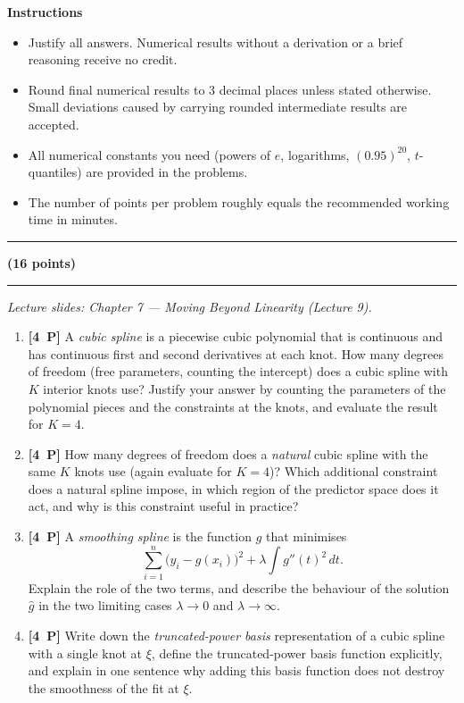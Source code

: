 \documentclass[11pt,a4paper]{article}
\newcommand{\problem}[2]{\par\vspace{7mm}\noindent{\large\textbf{Problem #1}}%
  \hfill{\large\textbf{(#2 points)}}\par\nopagebreak\vspace{0.6mm}%
  \noindent\rule{\textwidth}{0.6pt}\par\nopagebreak\vspace{2.5mm}}
\newcommand{\pp}[1]{\textbf{[#1~P]}\enspace}
\begin{document}
\vspace{2.5mm}
\textbf{Instructions}
\begin{itemize}[nosep,leftmargin=5.5mm]
  \item Justify all answers. Numerical results without a derivation or a brief reasoning receive no credit.
  \item Round final numerical results to 3 decimal places unless stated otherwise. Small deviations caused by carrying rounded intermediate results are accepted.
  \item All numerical constants you need (powers of $e$, logarithms, $(0.95)^{20}$, $t$-quantiles) are provided in the problems.
  \item The number of points per problem roughly equals the recommended working time in minutes.
\end{itemize}
\vspace{1mm}\noindent\rule{\textwidth}{0.6pt}

\problem{1: Moving beyond linearity --- splines}{16}
{\small\itshape Lecture slides: Chapter 7 --- Moving Beyond Linearity (Lecture 9).}\par\vspace{1mm}

\begin{enumerate}[label=(\alph*),leftmargin=7mm,itemsep=2.5mm]
  \item \pp{4} A \emph{cubic spline} is a piecewise cubic polynomial that is continuous and has
    continuous first and second derivatives at each knot. How many degrees of freedom (free
    parameters, counting the intercept) does a cubic spline with $K$ interior knots use?
    Justify your answer by counting the parameters of the polynomial pieces and the constraints
    at the knots, and evaluate the result for $K=4$.
  \item \pp{4} How many degrees of freedom does a \emph{natural} cubic spline with the same $K$
    knots use (again evaluate for $K=4$)? Which additional constraint does a natural spline
    impose, in which region of the predictor space does it act, and why is this constraint
    useful in practice?
  \item \pp{4} A \emph{smoothing spline} is the function $g$ that minimises
    \[
      \sum_{i=1}^{n}\bigl(y_i-g(x_i)\bigr)^2+\lambda\int g''(t)^2\,dt .
    \]
    Explain the role of the two terms, and describe the behaviour of the solution $\hat{g}$ in
    the two limiting cases $\lambda\to 0$ and $\lambda\to\infty$.
  \item \pp{4} Write down the \emph{truncated-power basis} representation of a cubic spline with
    a single knot at $\xi$, define the truncated-power basis function explicitly, and explain in
    one sentence why adding this basis function does not destroy the smoothness of the fit at
    $\xi$.
\end{enumerate}
\end{document}
